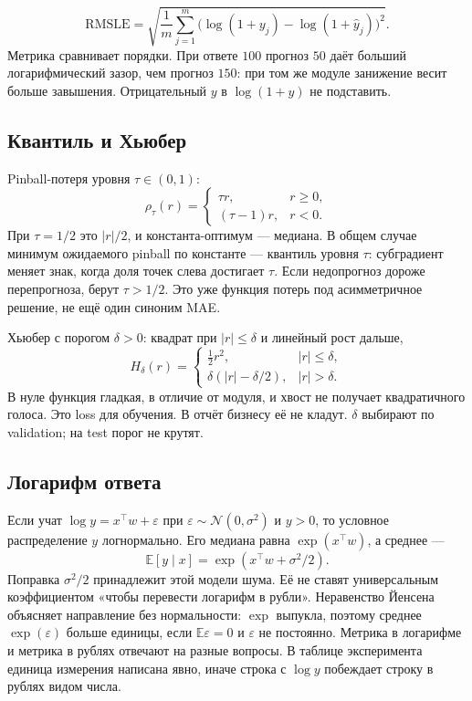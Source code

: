 \documentclass[11pt,a4paper]{article}
\begin{document}
\[
\mathrm{RMSLE}=\sqrt{\frac{1}{m}\sum_{j=1}^{m}\bigl(\log(1+y_j)-\log(1+\hat y_j)\bigr)^{2}}.
\]
Метрика сравнивает порядки. При ответе \(100\) прогноз \(50\) даёт больший логарифмический зазор, чем прогноз \(150\): при том же модуле занижение весит больше завышения. Отрицательный \(y\) в \(\log(1+y)\) не подставить.

\subsection{Квантиль и Хьюбер}

Pinball-потеря уровня \(\tau\in(0,1)\):
\[
\rho_{\tau}(r)=\begin{cases}\tau r,& r\ge 0,\\ (\tau-1)r,& r<0.\end{cases}
\]
При \(\tau=1/2\) это \(|r|/2\), и константа-оптимум --- медиана. В общем случае минимум ожидаемого pinball по константе --- квантиль уровня \(\tau\): субградиент меняет знак, когда доля точек слева достигает \(\tau\). Если недопрогноз дороже перепрогноза, берут \(\tau>1/2\). Это уже функция потерь под асимметричное решение, не ещё один синоним MAE.

Хьюбер с порогом \(\delta>0\): квадрат при \(|r|\le\delta\) и линейный рост дальше,
\[
H_{\delta}(r)=\begin{cases}\tfrac12 r^{2},& |r|\le\delta,\\ \delta(|r|-\delta/2),& |r|>\delta.\end{cases}
\]
В нуле функция гладкая, в отличие от модуля, и хвост не получает квадратичного голоса. Это loss для обучения. В отчёт бизнесу её не кладут. \(\delta\) выбирают по validation; на test порог не крутят.

\subsection{Логарифм ответа}

Если учат \(\log y=x^{\top}w+\varepsilon\) при \(\varepsilon\sim\mathcal N(0,\sigma^{2})\) и \(y>0\), то условное распределение \(y\) логнормально. Его медиана равна \(\exp(x^{\top}w)\), а среднее ---
\[
\mathbb E[y\mid x]=\exp(x^{\top}w+\sigma^{2}/2).
\]
Поправка \(\sigma^{2}/2\) принадлежит этой модели шума. Её не ставят универсальным коэффициентом «чтобы перевести логарифм в рубли». Неравенство Йенсена объясняет направление без нормальности: \(\exp\) выпукла, поэтому среднее \(\exp(\varepsilon)\) больше единицы, если \(\mathbb E\varepsilon=0\) и \(\varepsilon\) не постоянно. Метрика в логарифме и метрика в рублях отвечают на разные вопросы. В таблице эксперимента единица измерения написана явно, иначе строка с \(\log y\) побеждает строку в рублях видом числа.
\end{document}
